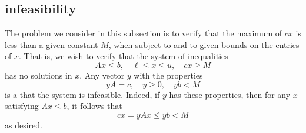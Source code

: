 %
%


\subsection{infeasibility}

The problem we consider in this subsection is to verify that the
maximum of $c x$ is less than a given constant $M$, when subject to
 and to given bounds on the entries of $x$.
That is, we wish to verify that the system of inequalities
\begin{equation}\label{eqn:empty}
A x \le b,\quad \ell \le x\le u,\quad c x \ge M
\end{equation}
has no solutions in $x$. Any vector $y$ with the properties
\begin{equation}\label{eqn:y}
  y A = c,\quad y\ge 0,\quad y b < M
\end{equation}
is a  that the system  is infeasible.  Indeed,
if $y$ has these properties, then for any $x$ satisfying
$A x \le b$, it follows that
\begin{equation}\label{eqn:cxM}
  c x = y A x \le y b < M
\end{equation}
as desired.


